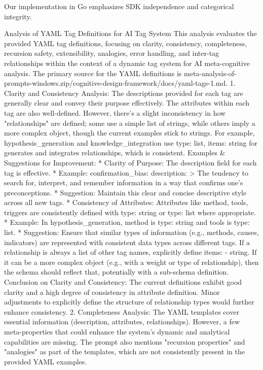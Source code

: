 Our implementation in Go emphasizes SDK independence and categorical integrity.

Analysis of YAML Tag Definitions for AI Tag System
This analysis evaluates the provided YAML tag definitions, focusing on clarity, consistency, completeness, recursion safety, extensibility, analogies, error handling, and inter-tag relationships within the context of a dynamic tag system for AI meta-cognitive analysis. The primary source for the YAML definitions is meta-analysis-of-prompts-windows.zip/cognitive-design-framework/docs/yaml-tags-1.md.
1. Clarity and Consistency
Analysis: The descriptions provided for each tag are generally clear and convey their purpose effectively. The attributes within each tag are also well-defined. However, there's a slight inconsistency in how "relationships" are defined; some use a simple list of strings, while others imply a more complex object, though the current examples stick to strings. For example, hypothesis_generation and knowledge_integration use type: list, items: string for generates and integrates relationships, which is consistent.
Examples & Suggestions for Improvement:
 * Clarity of Purpose: The description field for each tag is effective.
   * Example: confirmation_bias: description: > The tendency to search for, interpret, and remember information in a way that confirms one’s preconceptions.
   * Suggestion: Maintain this clear and concise descriptive style across all new tags.
 * Consistency of Attributes: Attributes like method, tools, triggers are consistently defined with type: string or type: list where appropriate.
   * Example: In hypothesis_generation, method is type: string and tools is type: list.
   * Suggestion: Ensure that similar types of information (e.g., methods, causes, indicators) are represented with consistent data types across different tags. If a relationship is always a list of other tag names, explicitly define items: - string. If it can be a more complex object (e.g., with a weight or type of relationship), then the schema should reflect that, potentially with a sub-schema definition.
Conclusion on Clarity and Consistency: The current definitions exhibit good clarity and a high degree of consistency in attribute definition. Minor adjustments to explicitly define the structure of relationship types would further enhance consistency.
2. Completeness
Analysis: The YAML templates cover essential information (description, attributes, relationships). However, a few meta-properties that could enhance the system's dynamic and analytical capabilities are missing. The prompt also mentions "recursion properties" and "analogies" as part of the templates, which are not consistently present in the provided YAML examples.
